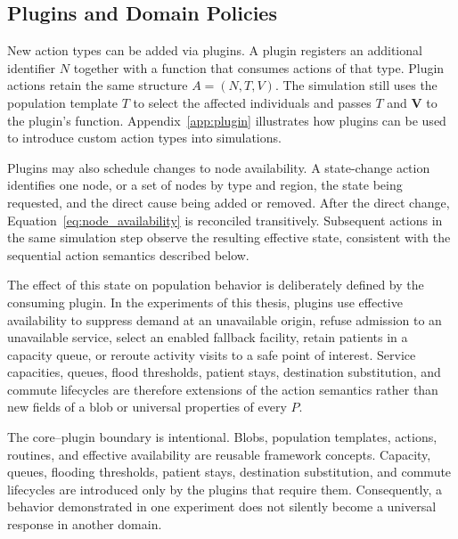 \documentclass[pdflatex,sn-mathphys-num]{sn-jnl}%
\newcommand\redb[1]{#1}
\theoremstyle{thmstyleone}%
\theoremstyle{thmstyletwo}%
\theoremstyle{thmstylethree}%
\begin{document}

\subsection{Plugins and Domain Policies}
New action types can be added via plugins. A plugin registers an additional identifier $N$ together with a function that consumes actions of that type. Plugin actions retain the same structure $A=(N,T,V)$. The simulation still uses the population template $T$ to select the affected individuals and passes $T$ and $\bm{V}$ to the plugin’s function. Appendix~\ref{app:plugin} illustrates how plugins can be used to introduce custom action types into simulations.

Plugins may also schedule changes to node availability. A state-change action identifies one node, or a set of nodes by type and region, the state being requested, and the direct cause being added or removed. After the direct change, Equation~\ref{eq:node_availability} is reconciled transitively. Subsequent actions in the same simulation step observe the resulting effective state, consistent with the sequential action semantics described below.

The effect of this state on population behavior is deliberately defined by the consuming plugin. In the experiments of this thesis, plugins use effective availability to suppress demand at an unavailable origin, refuse admission to an unavailable service, select an enabled fallback facility, retain patients in a capacity queue, or reroute activity visits to a safe point of interest. Service capacities, queues, flood thresholds, patient stays, destination substitution, and commute lifecycles are therefore extensions of the action semantics rather than new fields of a blob or universal properties of every $P$.



The core--plugin boundary is intentional. Blobs, population templates, actions, routines, and effective availability are reusable framework concepts. Capacity, queues, flooding thresholds, patient stays, destination substitution, and commute lifecycles are introduced only by the plugins that require them. Consequently, a behavior demonstrated in one experiment does not silently become a universal response in another domain.
\end{document}
